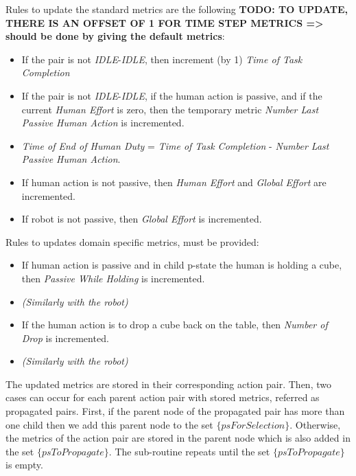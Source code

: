 Rules to update the standard metrics are the following \textbf{TODO: TO UPDATE, THERE IS AN OFFSET OF 1 FOR TIME STEP METRICS => should be done by giving the default metrics}:
\vspace{-\topsep}
\begin{itemize}
    \setlength\itemsep{-0.3em}
    \item If the pair is not \textit{IDLE}-\textit{IDLE}, then increment (by 1) \textit{Time of Task Completion}
    \item If the pair is not \textit{IDLE}-\textit{IDLE}, if the human action is passive, and if the current \textit{Human Effort} is zero, then the temporary metric \textit{Number Last Passive Human Action} is incremented.
    \item \textit{Time of End of Human Duty} = \textit{Time of Task Completion} - \textit{Number Last Passive Human Action}.
    \item If human action is not passive, then \textit{Human Effort} and \textit{Global Effort} are incremented.
    \item If robot is not passive, then \textit{Global Effort} is incremented.
\end{itemize}
Rules to updates domain specific metrics, must be provided:
\vspace{-\topsep}
\begin{itemize}
    \setlength\itemsep{-0.3em}
    \item If human action is passive and in child p-state the human is holding a cube, then \textit{Passive While Holding} is incremented.
    \item \textit{(Similarly with the robot)}
    \item If the human action is to drop a cube back on the table, then \textit{Number of Drop} is incremented.
    \item \textit{(Similarly with the robot)}
\end{itemize}

The updated metrics are stored in their corresponding action pair. Then, two cases can occur for each parent action pair with stored metrics, referred as propagated pairs. First, if the parent node of the propagated pair has more than one child then we add this parent node to the set $\{psForSelection\}$. Otherwise, the metrics of the action pair are stored in the parent node which is also added in the set $\{psToPropagate\}$. 
The sub-routine repeats until the set $\{psToPropagate\}$ is empty.

